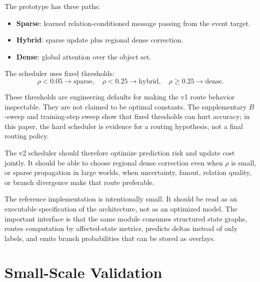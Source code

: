 \documentclass[11pt]{article}
\begin{document}
The prototype has three paths:
\begin{itemize}[leftmargin=*]
\item \textbf{Sparse}: learned relation-conditioned message passing from the
event target.
\item \textbf{Hybrid}: sparse update plus regional dense correction.
\item \textbf{Dense}: global attention over the object set.
\end{itemize}

The scheduler uses fixed thresholds:
\[
\rho < 0.05 \rightarrow \text{sparse}, \quad
\rho < 0.25 \rightarrow \text{hybrid}, \quad
\rho \geq 0.25 \rightarrow \text{dense}.
\]

These thresholds are engineering defaults for making the v1 route behavior
inspectable. They are not claimed to be optimal constants. The supplementary
\(B\)-sweep and training-step sweep show that fixed thresholds can hurt
accuracy; in this paper, the hard scheduler is evidence for a routing
hypothesis, not a final routing policy.

The v2 scheduler should therefore optimize prediction risk and update cost
jointly. It should be able to choose regional dense correction even when
\(\rho\) is small, or sparse propagation in large worlds, when uncertainty,
fanout, relation quality, or branch divergence make that route preferable.

The reference implementation is intentionally small. It should be read as an
executable specification of the architecture, not as an optimized model. The
important interface is that the same module consumes structured state graphs,
routes computation by affected-state metrics, predicts deltas instead of only
labels, and emits branch probabilities that can be stored as overlays.

\section{Small-Scale Validation}
\end{document}
